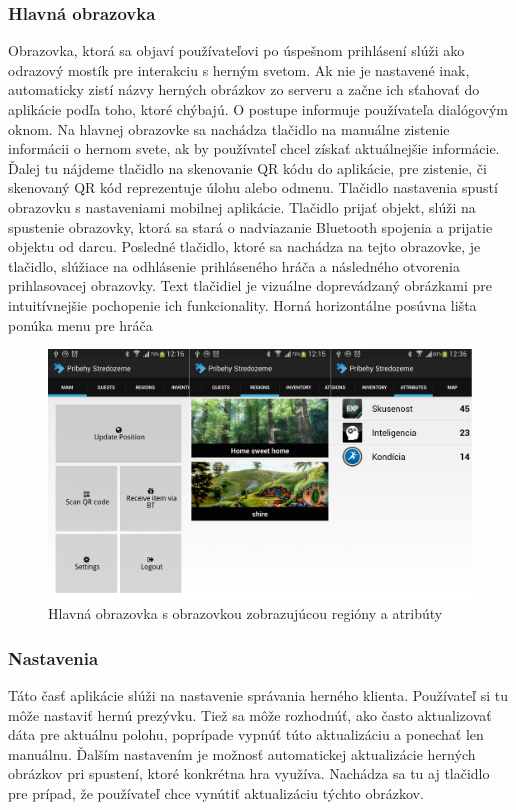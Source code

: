 \subsubsection{Hlavná obrazovka}
Obrazovka, ktorá sa objaví používateľovi po úspešnom prihlásení slúži ako odrazový mostík pre interakciu s herným svetom. Ak nie je nastavené inak, automaticky zistí názvy herných obrázkov zo serveru a začne ich sťahovať do aplikácie podľa toho, ktoré chýbajú. O postupe informuje používateľa dialógovým oknom. Na hlavnej obrazovke sa nachádza tlačidlo na manuálne zistenie informácii o hernom svete, ak by používateľ chcel získať aktuálnejšie informácie. Ďalej tu nájdeme tlačidlo na skenovanie QR kódu do aplikácie, pre zistenie, či skenovaný QR kód reprezentuje úlohu alebo odmenu. Tlačidlo nastavenia spustí obrazovku s nastaveniami mobilnej aplikácie. Tlačidlo prijať objekt, slúži na spustenie obrazovky, ktorá sa stará o nadviazanie Bluetooth spojenia a prijatie objektu od darcu. Posledné tlačidlo, ktoré sa nachádza na tejto obrazovke, je tlačidlo, slúžiace na odhlásenie prihláseného hráča a následného otvorenia prihlasovacej obrazovky. Text tlačidiel je vizuálne doprevádzaný obrázkami pre intuitívnejšie pochopenie ich funkcionality. Horná horizontálne posúvna lišta ponúka menu pre hráča

\begin{figure}[h]
  \centering
  \includegraphics[width=14cm]{mainmatter/imgs/klient_menuregattr.png}
  \caption{Hlavná obrazovka s obrazovkou zobrazujúcou regióny a atribúty}
  \label{fig:klient_menuregattr.png}
\end{figure}


\subsubsection{Nastavenia}
Táto časť aplikácie slúži na nastavenie správania herného klienta. Používateľ si tu môže nastaviť hernú prezývku. Tiež sa môže rozhodnúť, ako často aktualizovať dáta pre aktuálnu polohu, poprípade vypnúť túto aktualizáciu a ponechať len manuálnu. Ďalším nastavením je možnosť automatickej aktualizácie herných obrázkov pri spustení, ktoré konkrétna hra využíva. Nachádza sa tu aj tlačidlo pre prípad, že používateľ chce vynútiť aktualizáciu týchto obrázkov.

